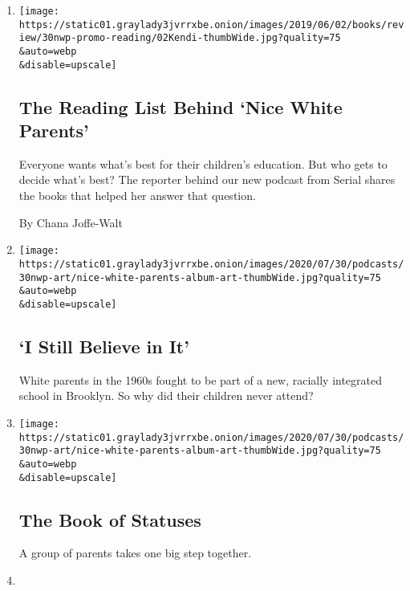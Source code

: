 \begin{enumerate}
\def\labelenumi{\arabic{enumi}.}
\item
  \href{/2020/07/30/podcasts/nice-white-parents-reading-list.html}{}

  \texttt{[image: https://static01.graylady3jvrrxbe.onion/images/2019/06/02/books/review/30nwp-promo-reading/02Kendi-thumbWide.jpg?quality=75\\\&auto=webp\\\&disable=upscale]}

  \hypertarget{the-reading-list-behind-nice-white-parents}{%
  \subsection{The Reading List Behind `Nice White
  Parents'}\label{the-reading-list-behind-nice-white-parents}}

  Everyone wants what's best for their children's education. But who
  gets to decide what's best? The reporter behind our new podcast from
  Serial shares the books that helped her answer that question.

  By Chana Joffe-Walt
\item
  \href{/2020/07/30/podcasts/nice-white-parents-serial-2.html}{}

  \texttt{[image: https://static01.graylady3jvrrxbe.onion/images/2020/07/30/podcasts/30nwp-art/nice-white-parents-album-art-thumbWide.jpg?quality=75\\\&auto=webp\\\&disable=upscale]}

  \hypertarget{i-still-believe-in-it}{%
  \subsection{`I Still Believe in It'}\label{i-still-believe-in-it}}

  White parents in the 1960s fought to be part of a new, racially
  integrated school in Brooklyn. So why did their children never attend?
\item
  \href{/2020/07/30/podcasts/nice-white-parents-serial.html}{}

  \texttt{[image: https://static01.graylady3jvrrxbe.onion/images/2020/07/30/podcasts/30nwp-art/nice-white-parents-album-art-thumbWide.jpg?quality=75\\\&auto=webp\\\&disable=upscale]}

  \hypertarget{the-book-of-statuses}{%
  \subsection{The Book of Statuses}\label{the-book-of-statuses}}

  A group of parents takes one big step together.
\item
  \href{/2020/07/24/podcasts/daily-newsletter-schools-reopening-summer-playlist.html}{}


\end{enumerate}
